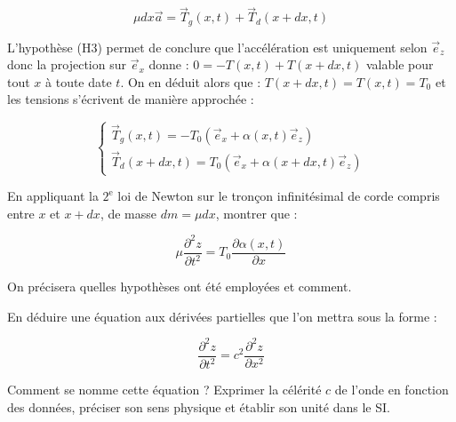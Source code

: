\begin{quest}
{    $$
    \mu d x \vec{a}=\vec{T}_g(x, t)+\vec{T}_d(x+d x, t)
    $$
    
    
    L'hypothèse (H3) permet de conclure que l'accélération est uniquement selon $\vec{e}_z$ donc la projection sur $\vec{e}_x$ donne : $0=-T(x, t)+T(x+d x, t)$ valable pour tout $x$ à toute date $t$. On en déduit alors que : $T(x+d x, t)=T(x, t)=T_0$ et les tensions s'écrivent de manière approchée :
    
    $$
    \left\{\begin{array}{c}
    \vec{T}_g(x, t)=-T_0\left(\vec{e}_x+\alpha(x, t) \vec{e}_z\right) \\
    \vec{T}_d(x+d x, t)=T_0\left(\vec{e}_x+\alpha(x+d x, t) \vec{e}_z\right)
    \end{array}\right.
    $$
    
}
\item En appliquant la \(2^{\mathrm{e}}\) loi de Newton sur le tronçon infinitésimal de corde compris entre \(x\) et \(x+d x\), de masse \(d m=\mu d x\), montrer que :

\begin{equation}
    \mu \frac{\partial^{2} z}{\partial t^{2}}=T_{0} \frac{\partial \alpha(x, t)}{\partial x}
\end{equation}

On précisera quelles hypothèses ont été employées et comment.
\item En déduire une équation aux dérivées partielles que l'on mettra sous la forme :

\begin{equation}\label{eq:onde}
    \frac{\partial^{2} z}{\partial t^{2}}=c^{2} \frac{\partial^{2} z}{\partial x^{2}}
\end{equation}

Comment se nomme cette équation ? Exprimer la célérité \(c\) de l'onde en fonction des données, préciser son sens physique et établir son unité dans le SI.


\end{quest}

